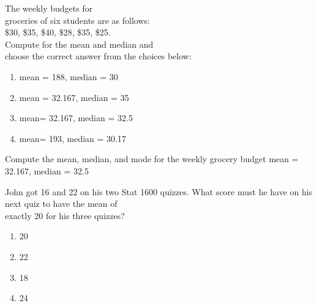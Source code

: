 \documentclass[11pt]{book}\usepackage[]{graphicx}\usepackage[]{color}
\begin{document}
\begin{exercises}
% 
  \begin{exercise} %

  The weekly budgets for \\ groceries of six students are as follows: \\
\$30, \$35, \$40, \$28, \$35, \$25. \\ Compute for the mean and median and \\ choose the correct answer from the choices below:
	\begin{enumerate}
	\item mean = 188, median = 30
	\item mean = 32.167, median = 35
	\item mean= 32.167, median = 32.5
	\item mean= 193, median = 30.17
	\end{enumerate}

	\vspace{5mm}
	\end{exercise}
	\vspace{2mm}
	\begin{solution}   %

	Compute the mean, median, and mode for the weekly grocery budget
	mean = 32.167, median = 32.5

	\end{solution}

  \begin{exercise} %

  John got 16 and 22 on his two Stat 1600 quizzes.  What score must he have on his next quiz to have the mean of \\ exactly 20 for his three quizzes?
	\begin{enumerate}
	\item 20
	\item 22
	\item 18
	\item 24
	\end{enumerate}

	\vspace{5mm}
	\end{exercise}
	\vspace{2mm}


\end{exercises}
\end{document}

